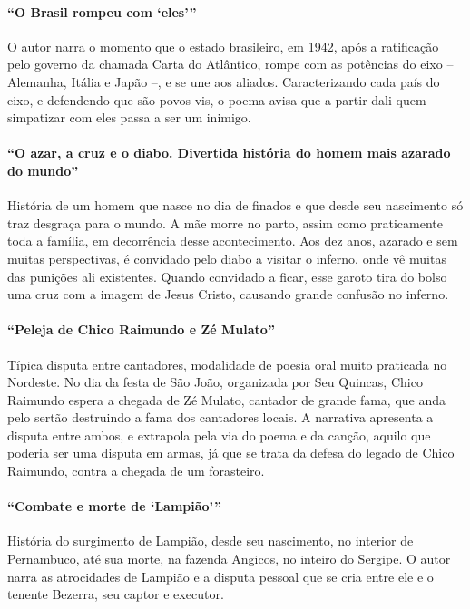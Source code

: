 \paragraph{``O Brasil rompeu com `eles'''}

O autor narra o momento que o estado brasileiro, em 1942, 
após a ratificação pelo governo da chamada Carta do Atlântico, 
rompe com as potências do eixo -- Alemanha, Itália e Japão --, e se une
aos aliados. Caracterizando cada país do eixo, e defendendo que são
povos vis, o poema avisa que a partir dali quem simpatizar com eles
passa a ser um inimigo.

\paragraph{``O azar, a cruz e o diabo. Divertida história do homem
mais azarado do mundo''}

História de um homem que nasce no dia de finados e que desde seu
nascimento só traz desgraça para o mundo. A mãe morre no parto, assim
como praticamente toda a família, em decorrência desse acontecimento.
Aos dez anos, azarado e sem muitas perspectivas, é convidado pelo diabo
a visitar o inferno, onde vê muitas das punições ali existentes. Quando
convidado a ficar, esse garoto tira do bolso uma cruz com a imagem de
Jesus Cristo, causando grande confusão no inferno.

\paragraph{``Peleja de Chico Raimundo e Zé Mulato''}

Típica disputa entre cantadores, modalidade de 
poesia oral muito praticada no Nordeste. No dia da
festa de São João, organizada por Seu Quincas, Chico Raimundo espera a
chegada de Zé Mulato, cantador de grande fama, que anda pelo sertão
destruindo a fama dos cantadores locais. A narrativa apresenta a
disputa entre ambos, e extrapola pela via do poema e da canção, aquilo
que poderia ser uma disputa em armas, já que se trata da defesa do
legado de Chico Raimundo, contra a chegada de um forasteiro.


\paragraph{``Combate e morte de `Lampião'''}

História do surgimento de Lampião, desde seu nascimento, no interior de
Pernambuco, até sua morte, na fazenda Angicos, no inteiro do Sergipe. O
autor narra as atrocidades de Lampião e a disputa pessoal que se cria
entre ele e o tenente Bezerra, seu captor e executor.


